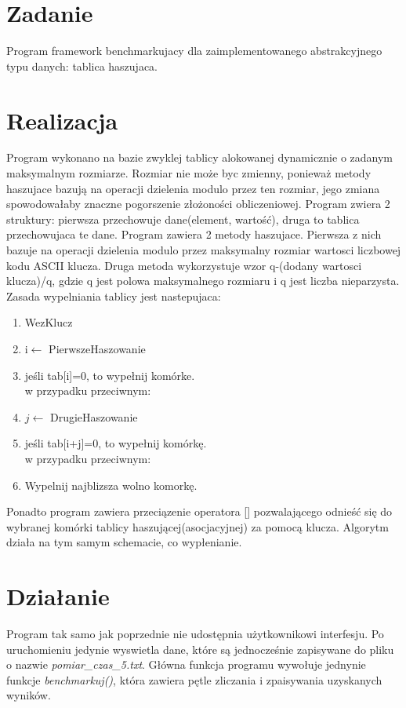 \documentclass[twoside]{article}
\newcommand{\+}{\discretionary{\mbox{\scriptsize$\hookleftarrow$}}{}{}}
\begin{document}
\section{Zadanie}
Program framework benchmarkujacy dla zaimplementowanego abstrakcyjnego typu danych: tablica haszujaca.
\section{Realizacja}
Program wykonano na bazie zwyklej tablicy alokowanej dynamicznie o zadanym maksymalnym rozmiarze. Rozmiar nie może byc zmienny, ponieważ metody haszujace bazują na operacji dzielenia modulo przez ten rozmiar, jego zmiana spowodowałaby znaczne pogorszenie złożoności obliczeniowej. Program zwiera 2 struktury: pierwsza przechowuje dane(element, wartość), druga to tablica przechowujaca te dane. Program zawiera 2 metody haszujace. Pierwsza z nich bazuje na operacji dzielenia modulo przez maksymalny rozmiar wartosci liczbowej kodu ASCII klucza. Druga metoda wykorzystuje wzor q-(dodany wartosci klucza)/q, gdzie q jest polowa maksymalnego rozmiaru i q jest liczba nieparzysta. Zasada wypelniania tablicy jest nastepujaca:
\begin{enumerate}
	\item WezKlucz
	\item i$\leftarrow$ PierwszeHaszowanie
	\item jeśli tab[i]=0, to wypełnij komórke. \\
	w przypadku przeciwnym:
	\item $j\leftarrow$ DrugieHaszowanie
	\item jeśli tab[i+j]=0, to wypełnij komórkę. \\
	w przypadku przeciwnym:
	\item Wypelnij najblizsza wolno komorkę.
\end{enumerate}
Ponadto program zawiera przeciązenie operatora [] pozwalającego odnieść się do wybranej komórki tablicy haszującej(asocjacyjnej) za pomocą klucza. Algorytm działa na tym samym schemacie, co wypłenianie.
\section{Działanie}
Program tak samo jak poprzednie nie udostępnia użytkownikowi interfesju. Po uruchomieniu jedynie wyswietla dane, które są jednocześnie zapisywane do pliku o nazwie \textsl{pomiar\_czas\_5.txt}. Główna funkcja programu wywołuje jednynie funkcje \textsl{benchmarkuj()}, która zawiera pętle zliczania i zpaisywania uzyskanych wyników.
\end{document}
